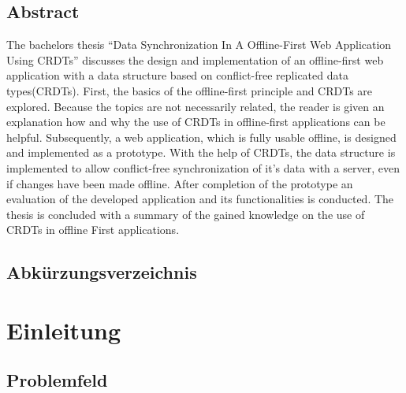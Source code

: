 \documentclass[a4paper, 12pt]{scrreprt}
\begin{document}
\section*{Abstract}
The bachelors thesis \enquote{Data Synchronization In A Offline-First Web Application Using CRDTs} discusses the design and implementation of an offline-first web application with a data structure based on conflict-free replicated data types(CRDTs). First, the basics of the offline-first principle and CRDTs are explored. Because the topics are not necessarily related, the reader is given an explanation how and why the use of CRDTs in offline-first applications can be helpful. Subsequently, a web application, which is fully usable offline, is designed and implemented as a prototype. With the help of CRDTs, the data structure is implemented to allow conflict-free synchronization of it's data with a server, even if changes have been made offline. After completion of the prototype an evaluation of the developed application and its functionalities is conducted. The thesis is concluded with a summary of the gained knowledge on the use of CRDTs in offline First applications.
\newpage

\pagestyle{fancy}
\cfoot{\thepage}
\lhead[\leftmark]{}
\rhead[]{\leftmark}

\tableofcontents
\newpage
\section*{Abkürzungsverzeichnis}
	\begin{acronym}[Bash]
	\end{acronym}

\newpage
{}
\chapter{Einleitung}\label{sec:Einleitung}
\section{Problemfeld}\label{sec:Problemfeld}
\end{document}
